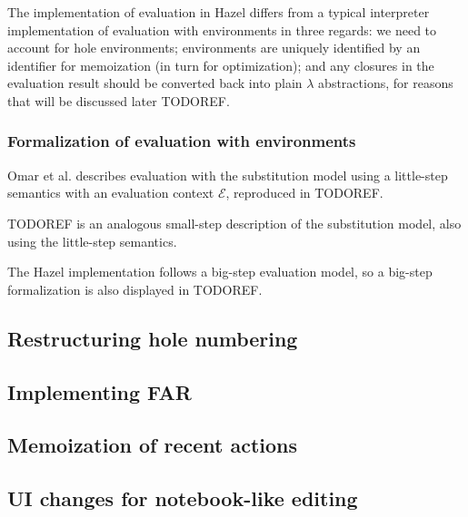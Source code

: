 The implementation of evaluation in Hazel differs from a typical interpreter implementation of evaluation with environments in three regards: we need to account for hole environments; environments are uniquely identified by an identifier for memoization (in turn for optimization); and any closures in the evaluation result should be converted back into plain $\lambda$ abstractions, for reasons that will be discussed later TODOREF.


\subsubsection{Formalization of evaluation with environments}
\label{sec:eval_with_env_formal}

Omar et al. \cite{conf/popl/HazelnutLive19} describes evaluation with the substitution model using a little-step semantics with an evaluation context $\mathcal{E}$, reproduced in TODOREF.


TODOREF is an analogous small-step description of the substitution model, also using the little-step semantics.


The Hazel implementation follows a big-step evaluation model, so a big-step formalization is also displayed in TODOREF.




\subsection{Restructuring hole numbering}
\label{sec:restructuring_hole_numbering}

\subsection{Implementing FAR}
\label{sec:implementing_far}

\subsection{Memoization of recent actions}
\label{sec:memoization_actions}

\subsection{UI changes for notebook-like editing}
\label{sec:notebook_ui}

